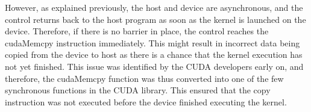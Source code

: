 	However, as explained previously, the host and device are asynchronous, and the control returns back to the host program as soon as the kernel is launched on the device. Therefore, if there is no barrier in place, the control reaches the cudaMemcpy instruction immediately. This might result in incorrect data being copied from the device to host as there is a chance that the kernel execution has not yet finished. This issue was identified by the CUDA developers early on, and therefore, the cudaMemcpy function was thus converted into one of the few synchronous functions in the CUDA library. This ensured that the copy instruction was not executed before the device finished executing the kernel.